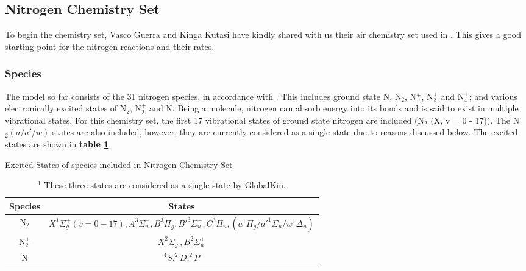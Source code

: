 \documentclass[11pt, oneside]{article}   	%
\begin{document}
\subsection{Nitrogen Chemistry Set}
To begin the chemistry set, Vasco Guerra and Kinga Kutasi have kindly shared with us their air chemistry set used in \cite{Kutasi2016tuning}.
This gives a good starting point for the nitrogen reactions and their rates.

\subsubsection{Species}

The model so far consists of the 31 nitrogen species, in accordance with \cite{Kutasi2016tuning}.
This includes ground state N, N$_2$, N$^+$, N$_2^+$ and N$_4^+$; and various electronically excited states of N$_2$, N$_2^+$ and N.
Being a molecule, nitrogen can absorb energy into its bonds and is said to exist in multiple vibrational states.
For this chemistry set, the first 17 vibrational states of ground state nitrogen are included (N$_2$ (X, v = 0 - 17)).
The N$_2 (a/a'/w)$ states are also included, however, they are currently considered as a single state due to reasons discussed below.
The excited states are shown in \textbf{table \ref{table:Species}}.



\begin{table}
\caption{Excited States of species included in Nitrogen Chemistry Set}
\begin{center}
\begin{tabular}{| c | c |}
\hline
Species & States \\
\hline\hline \hline
N$_2$ & $X^1\Sigma_g^+  (v = 0 - 17),  A^3\Sigma_u^+, B^3\Pi_g, B'^3\Sigma_u^-, C^3\Pi_u, (a^1\Pi_g/a'^1\Sigma_u/w^1\Delta_u)$\footnotemark  \\
\hline
N$_2^+$ & $X^2\Sigma_g^+, B^2\Sigma_u^+ $ \\
\hline
N & $^4S, ^2D,  ^2P$ \\
\hline
\end{tabular}
\end{center}
\label{table:Species}
\caption*{$^1$ These three states are considered as a single state by GlobalKin.}
\end{table}
\end{document}
